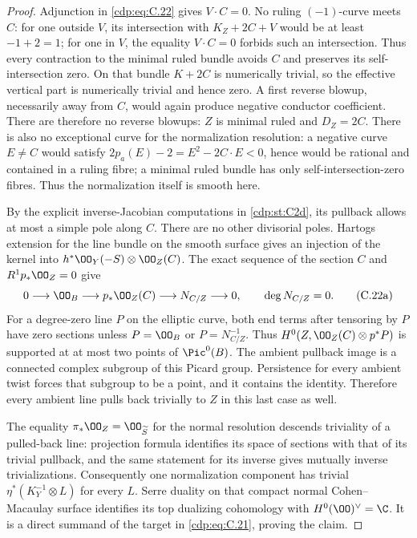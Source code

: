 \begin{proof}
Adjunction in \eqref{cdp:eq:C.22} gives $V\cdot C=0$. No ruling $(-1)$-curve meets $C$: for one outside $V$, its intersection with $K_Z+2C+V$ would be at least $-1+2=1$; for one in $V$, the equality $V\cdot C=0$ forbids such an intersection. Thus every contraction to the minimal ruled bundle avoids $C$ and preserves its self-intersection zero. On that bundle $K+2C$ is numerically trivial, so the effective vertical part is numerically trivial and hence zero. A first reverse blowup, necessarily away from $C$, would again produce negative conductor coefficient. There are therefore no reverse blowups: $Z$ is minimal ruled and $D_Z=2C$. There is also no exceptional curve for the normalization resolution: a negative curve $E\ne C$ would satisfy $2p_a(E)-2=E^2-2C\cdot E<0$, hence would be rational and contained in a ruling fibre; a minimal ruled bundle has only self-intersection-zero fibres. Thus the normalization itself is smooth here.

By the explicit inverse-Jacobian computations in \ref{cdp:st:C2d}, its pullback allows at most a simple pole along $C$. There are no other divisorial poles. Hartogs extension for the line bundle on the smooth surface gives an injection of the kernel into $h^*\OO_Y(-S)\otimes\OO_Z(C)$. The exact sequence of the section $C$ and $R^1p_*\OO_Z=0$ give
\[
 0\longrightarrow\OO_B\longrightarrow p_*\OO_Z(C)
   \longrightarrow N_{C/Z}\longrightarrow0,
 \qquad \deg N_{C/Z}=0.                              \tag{C.22a}\label{cdp:eq:C.22a}
\]
For a degree-zero line $P$ on the elliptic curve, both end terms after tensoring by $P$ have zero sections unless $P=\OO_B$ or $P=N_{C/Z}^{-1}$. Thus $H^0(Z,\OO_Z(C)\otimes p^*P)$ is supported at at most two points of $\Pic^0(B)$. The ambient pullback image is a connected complex subgroup of this Picard group. Persistence for every ambient twist forces that subgroup to be a point, and it contains the identity. Therefore every ambient line pulls back trivially to $Z$ in this last case as well.

The equality $\pi_*\OO_Z=\OO_{\widetilde S}$ for the normal resolution descends triviality of a pulled-back line: projection formula identifies its space of sections with that of its trivial pullback, and the same statement for its inverse gives mutually inverse trivializations. Consequently one normalization component has trivial $\eta^*(K_Y^{-1}\otimes L)$ for every $L$. Serre duality on that compact normal Cohen--Macaulay surface identifies its top dualizing cohomology with $H^0(\OO)^\vee=\C$. It is a direct summand of the target in \eqref{cdp:eq:C.21}, proving the claim.
\end{proof}


